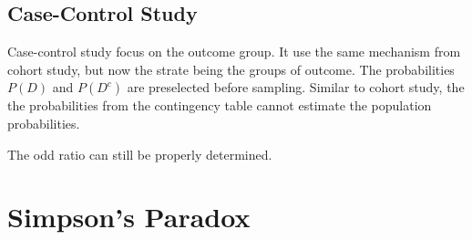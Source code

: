 \subsection{Case-Control Study}
Case-control study focus on the outcome group. It use the same mechanism from cohort study, but now the strate being the groups of outcome. The probabilities $P(D)$ and $P(D^c)$ are preselected before sampling. Similar to cohort study, the the probabilities from the contingency table cannot estimate 
the population probabilities. 

The odd ratio can still be properly determined.


\section{Simpson's Paradox}
